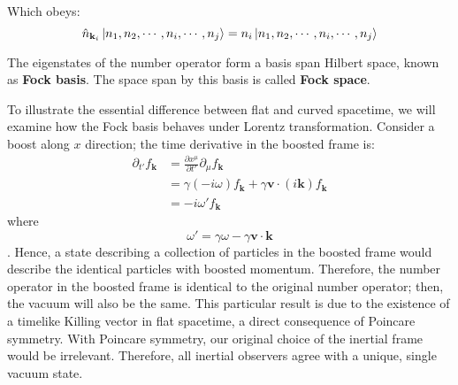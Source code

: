 \documentclass[12pt]{article}
\numberwithin{equation}{subsection}
\theoremstyle{mystyle}{\newtheorem{definition}{Definition}[subsection]}
\theoremstyle{mystyle}{\newtheorem{theorem}[definition]{Theorem}}
\theoremstyle{mystyle}{\newtheorem*{remark}{Remark}}
\theoremstyle{mystyle}{\newtheorem{example}{Example}[subsection]}
\theoremstyle{mystyle}{\newtheorem{examples}{Examples}[subsection]}
\theoremstyle{mystyle}{\newtheorem{cthm}{}[subsection]}
\newcommand{\tbf}[1]{\textbf{#1}}
\newcommand{\p}{\partial}
\begin{document}
Which obeys:
\begin{equation}
  \hat{n}_{\mathbf{k}_i}\ket{n_1,n_2,\cdots,n_i,\cdots,n_j}=    n_i\ket{n_1,n_2,\cdots,n_i,\cdots,n_j}
\end{equation}

The eigenstates of the number operator form a basis span Hilbert space, known as \tbf{Fock basis}.
The space span by this basis is called \tbf{Fock space}.

To illustrate the essential difference between flat and curved spacetime, we will examine how the Fock basis behaves under Lorentz transformation.
Consider a boost along \(x\) direction; the time derivative in the boosted frame is:
\begin{align}
  \p_{t'}f_{\mathbf{k}} & =\frac{\p x^{\mu}}{\p t'}\p_{\mu}f_{\mathbf{k}}                                   \\
                        & =\gamma(-i\omega)f_{\mathbf{k}}+\gamma\mathbf{v}\cdot (i\mathbf{k})f_{\mathbf{k}} \\
                        & =-i\omega'f_{\mathbf{k}}
\end{align}
where \[\omega'=\gamma\omega-\gamma\mathbf{v}\cdot \mathbf{k}\].
Hence, a state describing a collection of particles in the boosted frame would describe the identical particles with boosted momentum.
Therefore, the number operator in the boosted frame is identical to the original number operator; then, the vacuum will also be the same.
This particular result is due to the existence of a timelike Killing vector in flat spacetime, a direct consequence of Poincare symmetry.
With Poincare symmetry, our original choice of the inertial frame would be irrelevant.
Therefore, all inertial observers agree with a unique, single vacuum state.
\end{document}
